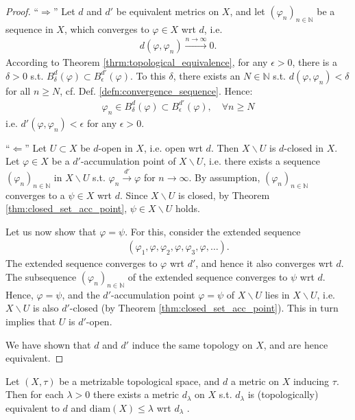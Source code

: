 \begin{proof}
	\enquote{$\Longrightarrow$} Let $d$ and $d'$ be equivalent metrics on $X$, and let $(\varphi_n)_{n\in\mathbb N}$ be a sequence in $X$, which converges to $\varphi\in X$ wrt $d$, i.e.
	\begin{align}
		d(\varphi, \varphi_n) \overset{n\to\infty}{\longrightarrow} 0.
	\end{align}
	According to Theorem \ref{thrm:topological_equivalence}, for any $\epsilon > 0$, there is a $\delta > 0$ s.t. $B_{\delta}^{d}(\varphi) \subset B_{\epsilon}^{d'}(\varphi)$. To this $\delta$, there exists an $N\in\mathbb N$ s.t. $d(\varphi, \varphi_n) < \delta$ for all $n\geq N$, cf. Def. \ref{defn:convergence_sequence}. Hence:
	\begin{align}
		\varphi_n\in B^{d}_{\delta}(\varphi) \subset B^{d'}_{\epsilon}(\varphi), \quad \forall n\geq N
	\end{align}
	i.e. $d'(\varphi, \varphi_n) < \epsilon$ for any $\epsilon > 0$.
	
	\enquote{$\Longleftarrow$} Let $U\subset X$ be $d$-open in $X$, i.e. open wrt $d$. Then $X\backslash U$ is $d$-closed in $X$. Let $\varphi\in X$ be a $d'$-accumulation point of $X\backslash U$, i.e. there exists a sequence $(\varphi_n)_{n\in\mathbb N}$ in $X\backslash U$ s.t. $\varphi_n \overset{d'}{\longrightarrow} \varphi$ for $n\to\infty$. By assumption, $(\varphi_n)_{n\in\mathbb N}$ converges to a $\psi\in X$ wrt $d$. Since $X\backslash U$ is closed, by Theorem \ref{thm:closed_set_acc_point}, $\psi\in X\backslash U$ holds. 
	
	Let us now show that $\varphi = \psi$. For this, consider the extended sequence 
	\begin{align}
		\left(\varphi_1, \varphi, \varphi_2, \varphi, \varphi_3, \varphi, \dots\right).
	\end{align}
	The extended sequence converges to $\varphi$ wrt $d'$, and hence it also converges wrt $d$. The subsequence $(\varphi_n)_{n\in\mathbb N}$ of the extended sequence converges to $\psi$ wrt $d$. Hence, $\varphi = \psi$, and the $d'$-accumulation point $\varphi=\psi$ of $X\backslash U$ lies in $X\backslash U$, i.e. $X\backslash U$ is also $d'$-closed (by Theorem \ref{thm:closed_set_acc_point}). This in turn implies that $U$ is $d'$-open.
	
	We have shown that $d$ and $d'$ induce the same topology on $X$, and are hence equivalent.
\end{proof}

\begin{theorem}\label{thrm:equivalent_metric_finite_diameter}
	Let $(X, \tau)$ be a metrizable topological space, and $d$ a metric on $X$ inducing $\tau$. Then for each $\lambda > 0$ there exists a metric $d_{\lambda}$ on $X$ s.t. $d_{\lambda}$ is (topologically) equivalent to $d$ and $\text{diam}(X) \leq \lambda$ wrt $d_{\lambda}$ \cite{topology-singh}.
\end{theorem}

